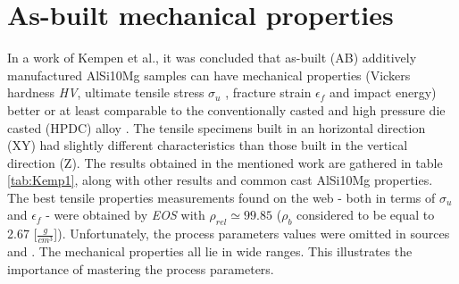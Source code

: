 \section{As-built mechanical properties}
\label{MMABMP}
In a work of Kempen et al., it was concluded that as-built (AB) additively manufactured AlSi10Mg samples can have mechanical properties (Vickers hardness \textit{HV}, ultimate tensile stress $\sigma_u$ , fracture strain $\epsilon_f$ and impact energy) better or at least comparable to the conventionally casted and high pressure die casted (HPDC) alloy \parencite{KEMPEN2012439}. The tensile specimens built in an horizontal direction (XY) had slightly different characteristics than those built in the vertical direction (Z). The results obtained in the mentioned work are gathered in table \ref{tab:Kemp1}, along with other results and common cast AlSi10Mg properties. The best tensile properties measurements found on the web - both in terms of $\sigma_u$ and $\epsilon_f$ - were obtained by \textit{EOS} with $\rho_{rel} \simeq 99.85$ \parencite{EOS} ($\rho_b$ considered to be equal to 2.67 [$\frac{g}{cm^3}$]). Unfortunately, the process parameters values were omitted in sources \parencite{EOS} and \parencite{KEMPEN2012439}. The mechanical properties all lie in wide ranges. This illustrates the importance of mastering the process parameters.

